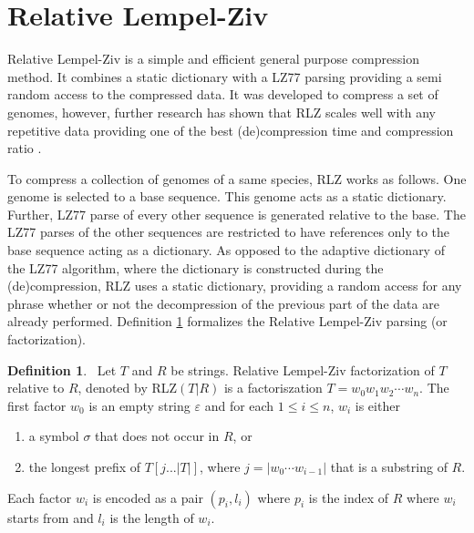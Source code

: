 \documentclass[english,twoside,censored,csm,algorithms-track-2020]{HYthesisML}
\theoremstyle{plain}
\theoremstyle{definition}
\newtheorem{definition}[theorem]{Definition}
\begin{document}
\section{Relative Lempel-Ziv}

Relative Lempel-Ziv is a simple and efficient \citep{Deorowicz11} general purpose \citep{Hoobin11}
compression method. It combines a static dictionary with a LZ77 parsing providing a semi random
access to the compressed data. It was developed to compress a set of genomes, however, further
research has shown that RLZ scales well with any repetitive data providing
one of the best (de)compression time and compression ratio \citep{Gagie16}.

To compress a collection of genomes of a same species, RLZ works as follows. One genome is selected to a
base sequence. This genome acts as a static dictionary. Further, LZ77 parse of every other sequence
is generated relative to the base. The LZ77 parses of the other sequences are restricted to have
references only to the base sequence acting as a dictionary. As opposed to the adaptive dictionary
of the LZ77 algorithm, where the dictionary is constructed during the (de)compression, RLZ uses
a static dictionary, providing a random access for any phrase whether or not the decompression
of the previous part of the data are already performed. Definition \ref{def-rlz} formalizes the
Relative Lempel-Ziv parsing (or factorization).




\begin{definition}~\label{def-rlz}
  Let $T$ and $R$ be strings. Relative Lempel-Ziv factorization of $T$ relative to $R$, denoted by
  RLZ$(T|R)$ is a factoriszation $T=w_0w_1w_2\cdots w_n$. The first factor $w_0$ is an empty string
  $\varepsilon$ and for each $1\leq i \leq n$, $w_i$ is either
  \begin{enumerate}
  \item a symbol $\sigma$ that does not occur in $R$, or
  \item the longest prefix of $T[j...|T|]$, where $j = |w_0\cdots w_{i-1}|$ that is a substring of $R$.
  \end{enumerate}
  Each factor $w_i$ is encoded as a pair $(p_i,l_i)$ where $p_i$ is the index of $R$ where $w_i$
  starts from and $l_i$ is the length of $w_i$.
\end{definition}
\end{document}
